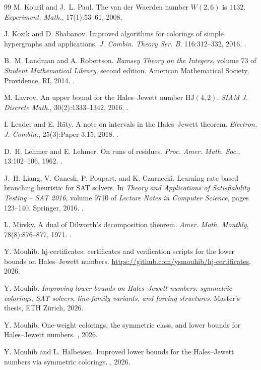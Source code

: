 \documentclass[12pt]{article}
\newcommand{\HJ}{\mathrm{HJ}}
\begin{document}
\begin{thebibliography}{99}
M. Kouril and J.~L. Paul. The van der Waerden number $W(2,6)$ is
$1132$. \emph{Experiment. Math.}, 17(1):53--61, 2008.

J. Kozik and D. Shabanov. Improved algorithms for colorings of simple
hypergraphs and applications. \emph{J. Combin. Theory Ser. B},
116:312--332, 2016. .

B.~M. Landman and A. Robertson. \emph{Ramsey Theory on the Integers},
volume 73 of \emph{Student Mathematical Library}, second edition.
American Mathematical Society, Providence, RI, 2014.
.

M. Lavrov. An upper bound for the Hales--Jewett number $\HJ(4,2)$.
\emph{SIAM J. Discrete Math.}, 30(2):1333--1342, 2016.
.

I. Leader and E. R\"aty. A note on intervals in the Hales--Jewett
theorem. \emph{Electron. J. Combin.}, 25(3):Paper 3.15, 2018.
.

D.~H. Lehmer and E. Lehmer. On runs of residues. \emph{Proc. Amer.
Math. Soc.}, 13:102--106, 1962.
.

J.~H. Liang, V. Ganesh, P. Poupart, and K. Czarnecki. Learning rate
based branching heuristic for {SAT} solvers. In \emph{Theory and
Applications of Satisfiability Testing -- SAT 2016}, volume 9710 of
\emph{Lecture Notes in Computer Science}, pages 123--140. Springer,
2016. .

L. Mirsky. A dual of Dilworth's decomposition theorem. \emph{Amer.
Math. Monthly}, 78(8):876--877, 1971. .

Y. Mouhib. hj-certificates: certificates and verification scripts for
the lower bounds on Hales--Jewett numbers.
\url{https://github.com/ysmouhib/hj-certificates}, 2026.

Y. Mouhib. \emph{Improving lower bounds on Hales--Jewett numbers:
symmetric colorings, SAT solvers, line-family variants, and forcing
structures}. Master's thesis, ETH Z\"urich, 2026.

Y. Mouhib. One-weight colorings, the symmetric class, and lower bounds
for Hales--Jewett numbers. , 2026.

Y. Mouhib and L. Halbeisen. Improved lower bounds for the Hales--Jewett
numbers via symmetric colorings. , 2026.


\end{thebibliography}
\end{document}

